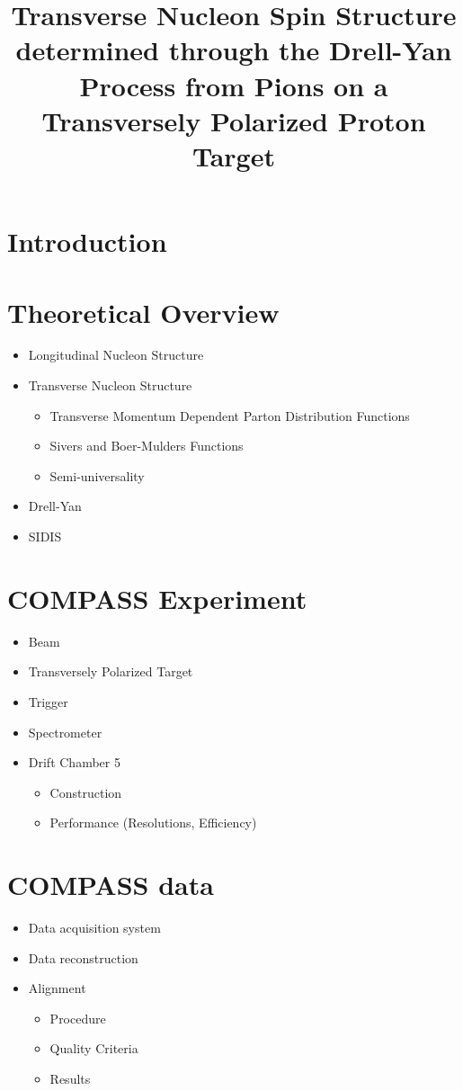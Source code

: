 \documentclass{article}
\title{Transverse Nucleon Spin Structure determined through the Drell-Yan
  Process from Pions on a Transversely Polarized Proton Target} \date{}
\begin{document}
\maketitle

\section{Introduction}


\section{Theoretical Overview}
\begin{itemize}
\item Longitudinal Nucleon Structure
\item Transverse Nucleon Structure
  \begin{itemize}
  \item Transverse Momentum Dependent Parton Distribution Functions
  \item Sivers and Boer-Mulders Functions
  \item Semi-universality
  \end{itemize}
  
\item{Drell-Yan}
\item{SIDIS}
\end{itemize}


\section{COMPASS Experiment}
\begin{itemize}
\item Beam
\item Transversely Polarized Target
\item Trigger
\item Spectrometer
\item Drift Chamber 5
  \begin{itemize}
  \item Construction
  \item Performance (Resolutions, Efficiency)
  \end{itemize}

\end{itemize}


\section{COMPASS data}
\begin{itemize}
\item Data acquisition system
\item Data reconstruction
\item Alignment
  \begin{itemize}
  \item Procedure
  \item Quality Criteria
  \item Results
  \end{itemize}
  
\end{itemize}
\end{document}
